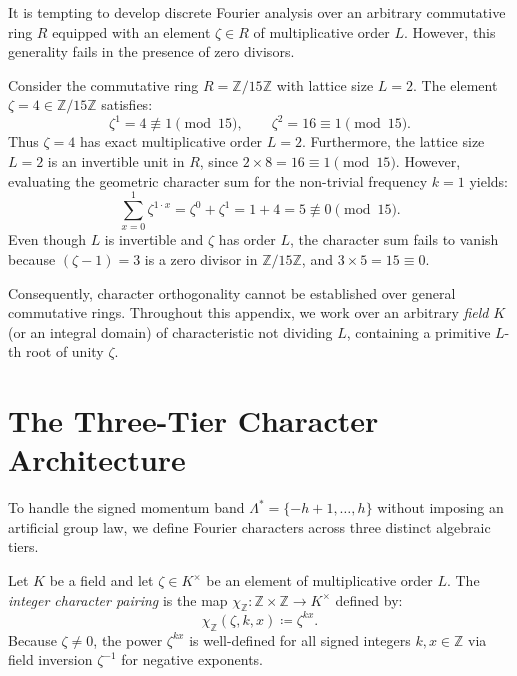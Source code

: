 It is tempting to develop discrete Fourier analysis over an arbitrary commutative ring $R$ equipped with an element $\zeta \in R$ of multiplicative order $L$. However, this generality fails in the presence of zero divisors.

\begin{example}
Consider the commutative ring $R = \mathbb{Z}/15\mathbb{Z}$ with lattice size $L = 2$.
The element $\zeta = 4 \in \mathbb{Z}/15\mathbb{Z}$ satisfies:
\begin{equation}
\zeta^1 = 4 \not\equiv 1 \pmod{15}, \qquad \zeta^2 = 16 \equiv 1 \pmod{15}.
\end{equation}
Thus $\zeta = 4$ has exact multiplicative order $L = 2$. Furthermore, the lattice size $L = 2$ is an invertible unit in $R$, since $2 \times 8 = 16 \equiv 1 \pmod{15}$.
However, evaluating the geometric character sum for the non-trivial frequency $k = 1$ yields:
\begin{equation}
\sum_{x=0}^{1} \zeta^{1 \cdot x} = \zeta^0 + \zeta^1 = 1 + 4 = 5 \not\equiv 0 \pmod{15}.
\end{equation}
Even though $L$ is invertible and $\zeta$ has order $L$, the character sum fails to vanish because $(\zeta - 1) = 3$ is a zero divisor in $\mathbb{Z}/15\mathbb{Z}$, and $3 \times 5 = 15 \equiv 0$.
\end{example}

Consequently, character orthogonality cannot be established over general commutative rings. Throughout this appendix, we work over an arbitrary \emph{field} $K$ (or an integral domain) of characteristic not dividing $L$, containing a primitive $L$-th root of unity $\zeta$.

\section{The Three-Tier Character Architecture}

To handle the signed momentum band $\Lambda^* = \{-h+1, \dots, h\}$ without imposing an artificial group law, we define Fourier characters across three distinct algebraic tiers.

\begin{definition}
Let $K$ be a field and let $\zeta \in K^\times$ be an element of multiplicative order $L$. The \emph{integer character pairing} is the map $\chi_{\mathbb{Z}}: \mathbb{Z} \times \mathbb{Z} \to K^\times$ defined by:
\begin{equation}
\chi_{\mathbb{Z}}(\zeta, k, x) \coloneqq \zeta^{k x}.
\end{equation}
Because $\zeta \neq 0$, the power $\zeta^{k x}$ is well-defined for all signed integers $k, x \in \mathbb{Z}$ via field inversion $\zeta^{-1}$ for negative exponents.
\end{definition}

